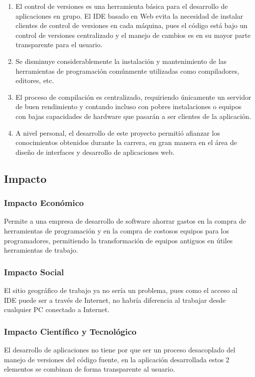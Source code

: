 \begin{enumerate}
	
	\item El control de versiones es una herramienta básica para el desarrollo de aplicaciones en grupo. El IDE basado en Web evita la necesidad de instalar clientes de control de versiones en cada máquina, pues el código está bajo un control de versiones centralizado y el manejo de cambios es en su mayor parte transparente para el usuario.
	
	\item Se disminuye considerablemente la instalación y mantenimiento de las herramientas de programación comúnmente utilizadas como compiladores, editores, etc.

	\item El proceso de compilación es centralizado, requiriendo únicamente un servidor de buen rendimiento y contando incluso con pobres instalaciones o equipos con bajas capacidades de hardware que pasarán a ser clientes de la aplicación.

	\item A nivel personal, el desarrollo de este proyecto permitió afianzar los conocimientos obtenidos durante la carrera, en gran manera en el área de diseño de interfaces y desarrollo de aplicaciones web.
	
\end{enumerate}

\subsection{Impacto}

\subsubsection{Impacto Económico}

Permite a una empresa de desarrollo de software ahorrar gastos en la compra de herramientas de programación y en la compra de costosos equipos para los programadores, permitiendo la transformación de equipos antiguos en útiles herramientas de trabajo.

\subsubsection{Impacto Social}

El sitio geográfico de trabajo ya no sería un problema, pues como el acceso al IDE puede ser a través de Internet, no habría diferencia al trabajar desde cualquier PC conectado a Internet.

\subsubsection{Impacto Científico y Tecnológico}

El desarrollo de aplicaciones no tiene por que ser un proceso desacoplado del manejo de versiones del código fuente, en la aplicación desarrollada estos 2 elementos se combinan de forma transparente al usuario.

